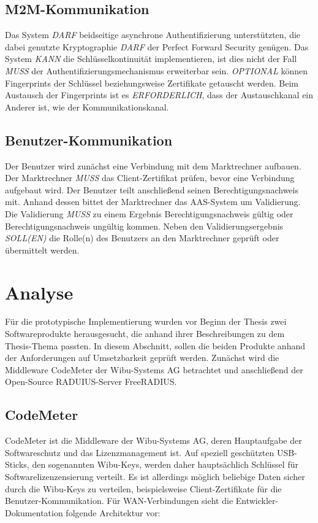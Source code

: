 \documentclass[11pt,a4paper]{report}
\begin{document}
\subsection{M2M-Kommunikation}

Das System \textit{DARF} beidseitige asynchrone Authentifizierung unterstützten, die dabei genutzte Kryptographie \textit{DARF} der Perfect Forward Security genügen. Das System \textit{KANN} die Schlüsselkontinuität implementieren, ist dies nicht der Fall \textit{MUSS} der Authentifizierungsmechanismus erweiterbar sein. \textit{OPTIONAL} können Fingerprints der Schlüssel beziehungsweise Zertifikate getauscht werden. Beim Austausch der Fingerprints ist es \textit{ERFORDERLICH}, dass der Austauschkanal ein Anderer ist, wie der Kommunikationskanal.

\subsection{Benutzer-Kommunikation}

Der Benutzer wird zunächst eine Verbindung mit dem Marktrechner aufbauen. Der Marktrechner \textit{MUSS} das Client-Zertifikat prüfen, bevor eine Verbindung aufgebaut wird. Der Benutzer teilt anschließend seinen Berechtigungsnachweis mit. Anhand dessen bittet der Marktrechner das AAS-System um Validierung. Die Validierung \textit{MUSS} zu einem Ergebnis Berechtigungsnachweis gültig oder Berechtigungsnachweis ungültig kommen. Neben den Validierungsergebnis \textit{SOLL(EN)} die Rolle(n) des Benutzers an den Marktrechner geprüft oder übermittelt werden.

\section{Analyse}

Für die prototypische Implementierung wurden vor Beginn der Thesis zwei Softwareprodukte herausgesucht, die anhand ihrer Beschreibungen zu dem Thesis-Thema passten. In diesem Abschnitt, sollen die beiden Produkte anhand der Anforderungen auf Umsetzbarkeit geprüft werden. Zunächst wird die Middleware CodeMeter der Wibu-Systems AG betrachtet und anschließend der Open-Source RADUIUS-Server FreeRADIUS.

\subsection{CodeMeter}

CodeMeter ist die Middleware der Wibu-Systems AG, deren Hauptaufgabe der Softwareschutz und das Lizenzmanagement ist. Auf speziell geschützten USB-Sticks, den sogenannten Wibu-Keys, werden daher hauptsächlich Schlüssel für Softwarelizenzensierung verteilt. Es ist allerdings möglich beliebige Daten sicher durch die Wibu-Keys zu verteilen, beispielsweise Client-Zertifikate für die Benutzer-Kommunikation. Für WAN-Verbindungen sieht die Entwickler-Dokumentation folgende Architektur vor:
\end{document}
